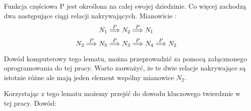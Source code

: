 \begin{lemma}
 Funkcja częściowa P jest określona na całej swojej dziedzinie.
 Co więcej zachodzą dwa następujące ciągi relacji nakrywających. Mianowicie :
 $$
    N_1 \stackrel{P}{\Longrightarrow} N_2 \stackrel{P}{\Longrightarrow} N_1
 $$
 $$
    N_2 \stackrel{P}{\Longrightarrow} N_5 \stackrel{P}{\Longrightarrow} N_3 \stackrel{P}{\Longrightarrow} N_4 \stackrel{P}{\Longrightarrow} N_2 
 $$
 
 Dowód komputerowy tego lematu, można przeprowadzić za pomocą załącznonego oprogramowania do tej pracy.
 Warto zauważyć, że te dwie relacje nakrywające są istotnie różne ale mają jeden element wspólny mianowice $ N_2 $.
 
 Korzystając z tego lematu możemy przejść do dowodu kluczowego twierdznie w tej pracy.
 Dowód:
 
 
\end{lemma}













